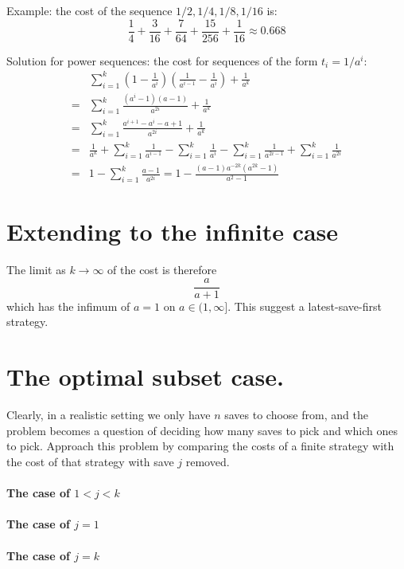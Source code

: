 \documentclass{article}
\begin{document}
Example: the cost of the sequence $1/2, 1/4, 1/8, 1/16$ is:
\[ \frac{1}{4}+\frac{3}{16}+\frac{7}{64} + \frac{15}{256} + \frac{1}{16} \approx 0.668 \]

Solution for power sequences: the cost for sequences of the form $t_i = 1/a^i$:
\begin{align*}
 & \sum_{i=1}^k \left(1-\frac{1}{a^i} \right) \left( \frac{1}{a^{i-1}} - \frac{1}{a^i} \right) + \frac{1}{a^k} \\
 =& \sum_{i=1}^k \frac{ (a^i-1) (a-1) }{ a^{2i} } + \frac{1}{a^k} \\
 =& \sum_{i=1}^k \frac{ a^{i+1}-a^i-a+1}{ a^{2i} } + \frac{1}{a^k} \\
 =& \frac{1}{a^k} + \sum_{i=1}^k \frac{1}{a^{i-1}} - \sum_{i=1}^k \frac{1}{a^i} - \sum_{i=1}^k \frac{1}{a^{2i-1}} + \sum_{i=1}^k \frac{1}{a^{2i}} \\
 =& 1 - \sum_{i=1}^k \frac{a-1}{a^{2i}} = 1- \frac{(a-1) a^{-2k}(a^{2k}-1)}{a^2-1}
\end{align*}

\section{Extending to the infinite case}
The limit as $k \rightarrow \infty$ of the cost is therefore
\[\frac{a}{a+1}\]
which has the infimum of $a=1$ on $a \in (1, \infty ]$.
This suggest a latest-save-first strategy.

\section{The optimal subset case.}

Clearly, in a realistic setting we only have $n$ saves to choose from, and the problem becomes a question of deciding how many saves to pick and which ones to pick.
Approach this problem by comparing the costs of a finite strategy with the cost of that strategy with save $j$ removed.
\paragraph{The case of $1<j<k$}
\paragraph{The case of $j=1$}
\paragraph{The case of $j=k$}
\end{document}

